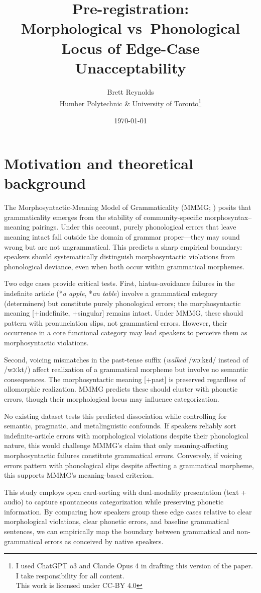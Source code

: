 \documentclass[12pt]{article}
\title{Pre-registration:\\Morphological vs~Phonological Locus of Edge-Case Unacceptability}
\author{Brett Reynolds \orcidlink{0000-0003-0073-7195}\\Humber Polytechnic \& University of Toronto\thanks{I used ChatGPT o3 and Claude Opus 4 in drafting this version of the paper. I take responsibility for all content. \\This work is licensed under CC-BY 4.0}}
\date{\today}
\begin{document}
\maketitle

\section{Motivation and theoretical background}

The Morphosyntactic-Meaning Model of Grammaticality (MMMG; \cite{ReynoldsThisVolume}) posits that grammaticality emerges from the stability of community-specific morphosyntax–meaning pairings. Under this account, purely phonological errors that leave meaning intact fall outside the domain of grammar proper—they may sound wrong but are not ungrammatical. This predicts a sharp empirical boundary: speakers should systematically distinguish morphosyntactic violations from phonological deviance, even when both occur within grammatical morphemes.

Two edge cases provide critical tests. First, hiatus-avoidance failures in the indefinite article (*\textit{a apple}, *\textit{an table}) involve a grammatical category (determiners) but constitute purely phonological errors; the morphosyntactic meaning [+indefinite, +singular] remains intact. Under MMMG, these should pattern with pronunciation slips, not grammatical errors. However, their occurrence in a core functional category may lead speakers to perceive them as morphosyntactic violations.

Second, voicing mismatches in the past-tense suffix (\textit{walked} /wɔːkɛd/ instead of /wɔːkt/) affect realization of a grammatical morpheme but involve no semantic consequences. The morphosyntactic meaning [+past] is preserved regardless of allomorphic realization. MMMG predicts these should cluster with phonetic errors, though their morphological locus may influence categorization.

No existing dataset tests this predicted dissociation while controlling for semantic, pragmatic, and metalinguistic confounds. If speakers reliably sort indefinite-article errors with morphological violations despite their phonological nature, this would challenge MMMG's claim that only meaning-affecting morphosyntactic failures constitute grammatical errors. Conversely, if voicing errors pattern with phonological slips despite affecting a grammatical morpheme, this supports MMMG's meaning-based criterion.

This study employs open card-sorting with dual-modality presentation (text + audio) to capture spontaneous categorization while preserving phonetic information. By comparing how speakers group these edge cases relative to clear morphological violations, clear phonetic errors, and baseline grammatical sentences, we can empirically map the boundary between grammatical and non-grammatical errors as conceived by native speakers.
\end{document}
